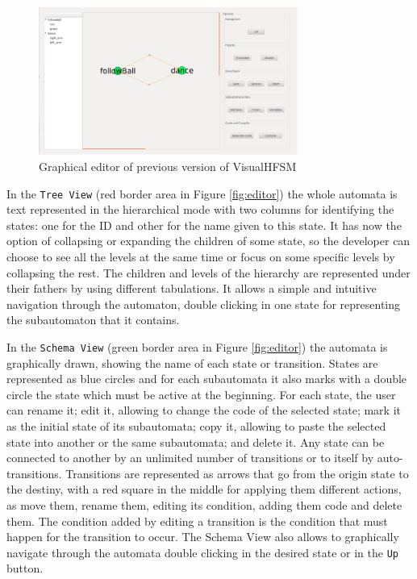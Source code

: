 \documentclass[journal,twoside]{JoPhA}
\begin{document}
\begin{figure}[ht!]
\begin{center}
        \includegraphics[width=8.5cm]{figs/editor-old.png}
\end{center}
\caption{Graphical editor of previous version of VisualHFSM}
\label{fig:editor-old}
\end{figure}

In the \texttt{Tree View} (red border area in Figure \ref{fig:editor}) the whole automata is text represented in the hierarchical mode with two columns for identifying the states: one for the ID and other for the name given to this state. It has now the option of collapsing or expanding the children of some state, so the developer can choose to see all the levels at the same time or focus on some specific levels by collapsing the rest. The children and levels of the hierarchy are represented under their fathers by using different tabulations. It allows a simple and intuitive navigation through the automaton, double clicking in one state for representing the subautomaton that it contains.

In the \texttt{Schema View} (green border area in Figure \ref{fig:editor}) the automata is graphically drawn, showing the name of each state or transition. States are represented as blue circles and for each subautomata it also marks with a double circle the state which must be active at the beginning. For each state, the user can rename it; edit it, allowing to change the code of the selected state; mark it as the initial state of its subautomata; copy it, allowing to paste the selected state into another or the same subautomata; and delete it. Any state can be connected to another by an unlimited number of transitions or to itself by auto-transitions. Transitions are represented as arrows that go from the origin state to the destiny, with a red square in the middle for applying them different actions, as move them, rename them, editing its condition, adding them code and delete them. The condition added by editing a transition is the condition that must happen for the transition to occur. The Schema View also allows to graphically navigate through the automata double clicking in the desired state or in the \texttt{Up} button. %
\end{document}
